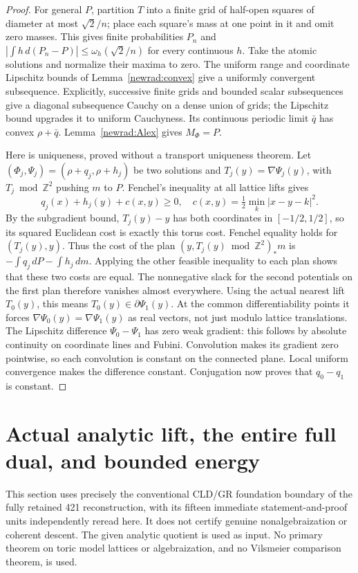 \begin{proof}
For general $P$, partition $T$ into a finite grid of half-open squares
of diameter at most $\sqrt2/n$; place each square's mass at one point
in it and omit zero masses. This gives finite probabilities $P_n$ and
$|\int h\,d(P_n-P)|\le\omega_h(\sqrt2/n)$ for every continuous $h$.
Take the atomic solutions and normalize their maxima to zero. The
uniform range and coordinate Lipschitz bounds of Lemma~\ref{newrad:convex}
give a uniformly convergent subsequence. Explicitly, successive finite
grids and bounded scalar subsequences give a diagonal subsequence
Cauchy on a dense union of grids; the Lipschitz bound upgrades it to
uniform Cauchyness. Its continuous periodic limit $\bar q$ has convex
$\rho+\bar q$. Lemma~\ref{newrad:Alex} gives $M_\Phi=P$.

Here is uniqueness, proved without a transport uniqueness theorem.
Let $(\Phi_j,\Psi_j)=(\rho+q_j,\rho+h_j)$ be two solutions and
$T_j(y)=\nabla\Psi_j(y)$, with $T_j\bmod\mathbb Z^2$ pushing $m$
to $P$. Fenchel's inequality at all lattice lifts gives
\[
 q_j(x)+h_j(y)+c(x,y)\ge0,
 \quad c(x,y)=\tfrac12\min_k|x-y-k|^2.
\]
By the subgradient bound, $T_j(y)-y$ has both coordinates in
$[-1/2,1/2]$, so its squared Euclidean cost is exactly this torus
cost. Fenchel equality holds for $(T_j(y),y)$. Thus the cost of the
plan $(y,T_j(y)\bmod\mathbb Z^2)_*m$ is
$-\int q_j\,dP-\int h_j\,dm$. Applying the other feasible
inequality to each plan shows that these two costs are equal.
The nonnegative slack for the second potentials on the first plan
therefore vanishes almost everywhere. Using the actual nearest lift
$T_0(y)$, this means $T_0(y)\in\partial\Psi_1(y)$.
At the common differentiability points it forces
$\nabla\Psi_0(y)=\nabla\Psi_1(y)$ as real vectors, not just modulo
lattice translations. The Lipschitz difference $\Psi_0-\Psi_1$ has
zero weak gradient: this follows by absolute continuity on coordinate
lines and Fubini. Convolution makes its gradient zero pointwise, so
each convolution is constant on the connected plane. Local uniform
convergence makes the difference constant. Conjugation now proves
that $q_0-q_1$ is constant.
\end{proof}

\section{Actual analytic lift, the entire full dual, and bounded energy}
This section uses precisely the conventional CLD/GR foundation boundary
of the fully retained 421 reconstruction, with its fifteen immediate
statement-and-proof units independently reread here. It does not certify
genuine nonalgebraization or coherent descent. The given analytic quotient
is used as input. No primary theorem on toric model lattices or
algebraization, and no Vilsmeier comparison theorem, is used.

